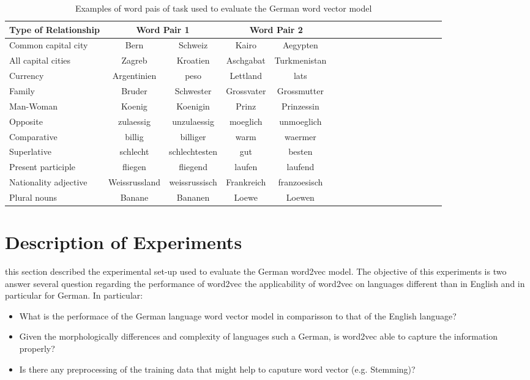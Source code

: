 \begin{table}[h]
  \centering
  \caption{Examples of word pais  of task  used  to evaluate the German word
    vector model }
  \label{tab:task_deutsch_modified}

  \begin{tabular}{ |l| |c|*{4}{c| |c| c | c }  }

  \hline           
  Type of Relationship &  \multicolumn{2}{c||}{Word Pair 1} &
  \multicolumn{2}{c|}{Word Pair 2} \\  \hline           
  Common capital city & Bern &  Schweiz & Kairo  & Aegypten \\ 
  All capital cities  & Zagreb &  Kroatien & Aschgabat & Turkmenistan  \\
  Currency & Argentinien & peso  & Lettland  & lats \\ 
  Family & Bruder & Schwester  & Grossvater & Grossmutter \\
  Man-Woman & Koenig & Koenigin  &  Prinz & Prinzessin   \\  \hline  
  Opposite & zulaessig & unzulaessig & moeglich & unmoeglich \\  
  Comparative & billig & billiger & warm & waermer \\  
  Superlative & schlecht & schlechtesten & gut & besten \\  
  Present participle & fliegen & fliegend & laufen & laufend \\  
  Nationality adjective & Weissrussland & weissrussisch & Frankreich  & franzoesisch  \\  
  Plural nouns  & Banane & Bananen & Loewe & Loewen \\
  \hline
\end{tabular}
\end{table}



\section{Description of Experiments}
\label{sec:german_eng_experiments}

this section described the experimental set-up used to evaluate the German
word2vec model. The objective of this experiments is two answer several
question regarding the performance of word2vec the applicability of word2vec
on languages different than in English and in particular for German.  In
particular:

\begin{itemize}
\item What is the performace of the German language word vector model in comparisson to that of
  the English language?
\item Given the morphologically differences and complexity of languages such
  a German, is word2vec able to capture the information properly?
\item Is there any preprocessing of the training data  that might help to caputure word vector
  (e.g. Stemming)?
\end{itemize}

